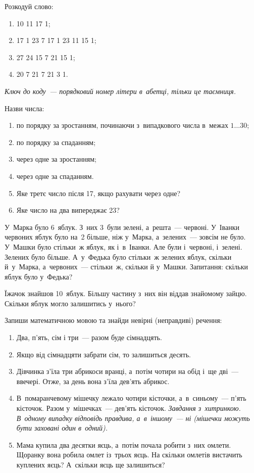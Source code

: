 \problem
Розкодуй слово:
\begin{enumerate}
  \item 10 11 17 1;
  \item 17 1 23 7 17 1 23 11 15 1;
  \item 27 24 15 7 21 15 1;
  \item 20 7 21 7 21 3 1.
\end{enumerate}

\emph{%
Ключ до коду~--- порядковий номер літери в~абетці, тільки це таємниця.
}


\problem
Назви числа:
\begin{enumerate}
  \item по порядку за зростанням, починаючи з~випадкового числа
  в~межах $1\ldots30$;
  \item по порядку за спаданням;
  \item через одне за зростанням;
  \item через одне за спаданням.
  \item Яке третє число після 17, якщо рахувати через одне?
  \item Яке число на два випереджає 23?
\end{enumerate}


\problem
У~Марка було 6~яблук. З~них 3~були зелені, а~решта~--- червоні.
У~Іванки червоних яблук було на~2 більше, ніж у~Марка,
а~зелених~--- зовсім не було.
У~Машки було стільки~ж яблук, як і~в~Іванки.
Але були і~червоні, і~зелені. Зелених було більше.
А~у~Федька було стільки~ж зелених яблук, скільки й~у~Марка,
а~червоних~--- стільки~ж, скільки й у~Машки.
Запитання: скільки яблук було у~Федька?


\problem
Їжачок знайшов 10~яблук.
Більшу частину з~них він віддав знайомому зайцю.
Скільки яблук могло залишитись у~нього?


\problem
Запиши математичною мовою та знайди невірні (неправдиві) речення:
\begin{enumerate}
  \item Два, п'ять, сім і три~--- разом буде сімнадцять.
  \item Якщо від сімнадцяти забрати сім, то залишиться десять.
  \item Дівчинка з'їла три абрикоси вранці, а~потім чотири на обід
  і~ще дві~--- ввечері. Отже, за день вона з'їла дев'ять абрикос.
  \item В~помаранчевому мішечку лежало чотири кісточки,
  а~в~синьому~--- п'ять кісточок. Разом у~мішечках~--- дев'ять кісточок.
  \emph{Завдання з~хитринкою. В~одному випадку відповідь правдива,
  а~в~іншому~--- ні (мішечки можуть бути заховані один в~одний).}
  \item Мама купила два десятки яєць, а~потім почала робити з~них омлети.
  Щоранку вона робила омлет із~трьох яєць.
  На скільки омлетів вистачить куплених яєць? А~скільки яєць ще залишиться?
\end{enumerate}


